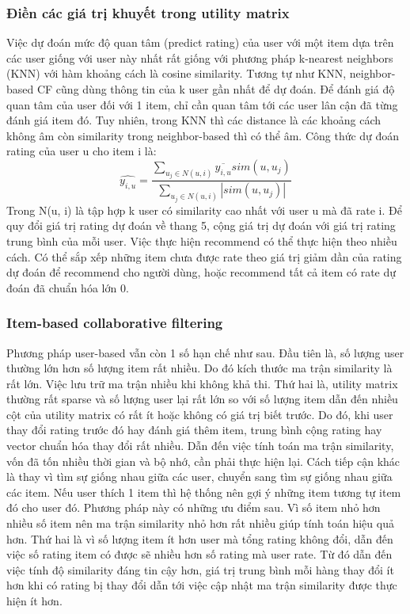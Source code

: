 \subsubsection{Điền các giá trị khuyết trong utility matrix}
Việc dự đoán mức độ quan tâm (predict rating) của user với một item dựa trên các user giống với user này nhất rất giống với phương pháp k-nearest neighbors (KNN) với hàm khoảng cách là cosine similarity. Tương tự như KNN, neighbor-based CF cũng dùng thông tin của k user gần nhất để dự đoán. Để đánh giá độ quan tâm của user đối với 1 item, chỉ cần quan tâm tới các user lân cận đã từng đánh giá item đó. Tuy nhiên, trong KNN thì các distance là các khoảng cách không âm còn similarity trong neighbor-based thì có thể âm. Công thức dự đoán rating của user u cho item i là:
\begin{equation}
    \widehat{y_{i,u}} = \frac{\sum_{u_j \in N(u,i)} \overline{y_{i,u}} sim(u,u_j)}
                        {\sum_{u_j \in N(u,i)} |sim(u,u_j)|}
\end{equation}
Trong N(u, i) là tập hợp k user có similarity cao nhất với user u mà đã rate i.
Để quy đổi giá trị rating dự đoán về thang 5, cộng giá trị dự đoán với giá trị rating trung bình của mỗi user.
\newline Việc thực hiện recommend có thể thực hiện theo nhiều cách. Có thể sắp xếp những item chưa được rate theo giá trị giảm dần của rating dự đoán để recommend cho người dùng, hoặc recommend tất cả item có rate dự đoán đã chuẩn hóa lớn 0.

\subsubsection{Item-based collaborative filtering}
Phương pháp user-based vẫn còn 1 số hạn chế như sau. Đầu tiên là, số lượng user thường lớn hơn số lượng item rất nhiều. Do đó kích thước ma trận similarity là rất lớn. Việc lưu trữ ma trận nhiều khi không khả thi. Thứ hai là, utility matrix thường rất sparse và số lượng user lại rất lớn so với số lượng item dẫn đến nhiều cột của utility matrix có rất ít hoặc không có giá trị biết trước. Do đó, khi user thay đổi rating trước đó hay đánh giá thêm item, trung bình cộng rating hay vector chuẩn hóa thay đổi rất nhiều. Dẫn đến việc tính toán ma trận similarity, vốn đã tốn nhiều thời gian và bộ nhớ, cần phải thực hiện lại.
\newline Cách tiếp cận khác là thay vì tìm sự giống nhau giữa các user, chuyển sang tìm sự giống nhau giữa các item. Nếu user thích 1 item thì hệ thống nên gợi ý những item tương tự item đó cho user đó. Phương pháp này có những ưu điểm sau. Vì số item nhỏ hơn nhiều số item nên ma trận similarity nhỏ hơn rất nhiều giúp tính toán hiệu quả hơn. Thứ hai là vì số lượng item ít hơn user mà tổng rating không đổi, dẫn đến việc số rating item có được sẽ nhiều hơn số rating mà user rate. Từ đó dẫn đến việc tính độ similarity đáng tin cậy hơn, giá trị trung bình mỗi hàng thay đổi ít hơn khi có rating bị thay đổi dẫn tới việc cập nhật ma trận similarity được thực hiện ít hơn.

